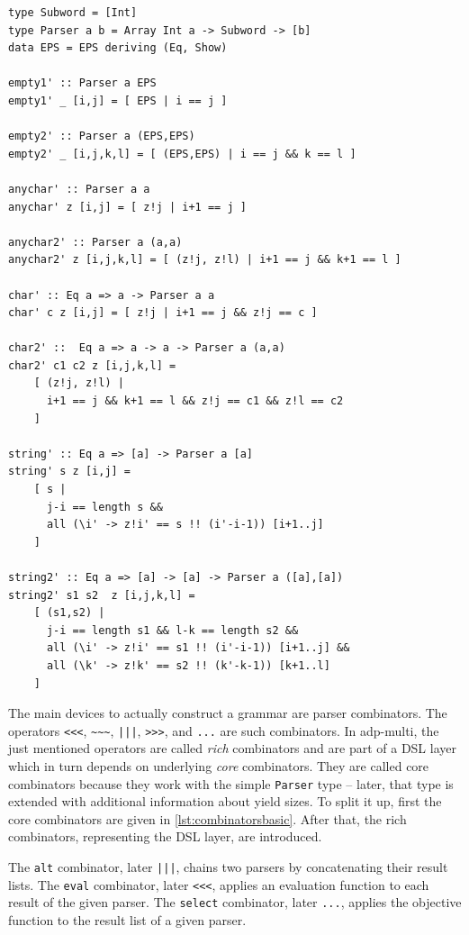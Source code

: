 \documentclass[
    a4paper,
    12pt,
    twoside,
    BCOR=12mm,
    parskip=half,
    chapterprefix,
    numbers=noenddot,
    bibliography=totoc
]{scrbook}
\begin{document}
\begin{lstlisting}[label=lst:elementary,caption=Elementary parsers]
type Subword = [Int]
type Parser a b = Array Int a -> Subword -> [b]
data EPS = EPS deriving (Eq, Show)

empty1' :: Parser a EPS
empty1' _ [i,j] = [ EPS | i == j ]

empty2' :: Parser a (EPS,EPS)
empty2' _ [i,j,k,l] = [ (EPS,EPS) | i == j && k == l ]

anychar' :: Parser a a
anychar' z [i,j] = [ z!j | i+1 == j ]

anychar2' :: Parser a (a,a)
anychar2' z [i,j,k,l] = [ (z!j, z!l) | i+1 == j && k+1 == l ]

char' :: Eq a => a -> Parser a a
char' c z [i,j] = [ z!j | i+1 == j && z!j == c ]

char2' ::  Eq a => a -> a -> Parser a (a,a)
char2' c1 c2 z [i,j,k,l] = 
    [ (z!j, z!l) | 
      i+1 == j && k+1 == l && z!j == c1 && z!l == c2 
    ]
		
string' :: Eq a => [a] -> Parser a [a]
string' s z [i,j] =
    [ s | 
      j-i == length s && 
      all (\i' -> z!i' == s !! (i'-i-1)) [i+1..j] 
    ]
		
string2' :: Eq a => [a] -> [a] -> Parser a ([a],[a])
string2' s1 s2  z [i,j,k,l] = 
    [ (s1,s2) |
      j-i == length s1 && l-k == length s2 &&
      all (\i' -> z!i' == s1 !! (i'-i-1)) [i+1..j] &&
      all (\k' -> z!k' == s2 !! (k'-k-1)) [k+1..l]
    ]
\end{lstlisting}

The main devices to actually construct a grammar are parser combinators. The operators \verb|<<<|, \verb|~~~|, \verb/|||/, \verb|>>>|, and \verb|...| are such combinators. In adp-multi, the just mentioned operators are called \emph{rich} combinators and are part of a \gls{DSL} layer which in turn depends on underlying \emph{core} combinators. They are called core combinators because they work with the simple \verb|Parser| type -- later, that type is extended with additional information about yield sizes. To split it up, first the core combinators are given in \cref{lst:combinatorsbasic}. After that, the rich combinators, representing the \gls{DSL} layer, are introduced.

The \verb|alt| combinator, later \verb/|||/, chains two parsers by concatenating their result lists. The \verb|eval| combinator, later \verb|<<<|, applies an evaluation function to each result of the given parser. The \verb|select| combinator, later \verb/.../, applies the objective function to the result list of a given parser.
\end{document}
